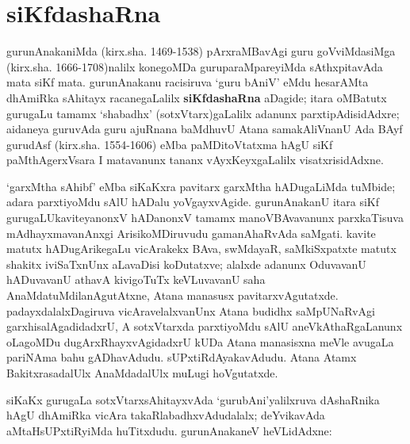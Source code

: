 \makeatletter
\def\@makechapterhead#1{%
  \vspace*{10\p@}%
{\fontsize{13pt}{13pt}\selectfont\raggedright{\bf  BeY joVdf siMgf}\par}
\vspace*{25\p@}%
  {\parindent \z@ \centering \normalfont
    \ifnum \c@secnumdepth >\m@ne
      \if@mainmatter
        {\huge\bfseries  #1}\par\nobreak
	\vskip 4pt
      \fi
    \fi
\smallskip 

 \vskip 10\p@  
{\fontsize{12pt}{12pt}\selectfont\raggedleft{anu: \bf pu.ti.na.}\par}
  }
\vskip 40\p@}
\makeatother


\chapter{siKfdashaRna}\label{chap007}

gurunAnakaniMda (kirx.sha. {\rm 1469-1538}) pArxraMBavAgi guru goVviMdasiMga (kirx.sha. {\rm 1666-1708})nalilx konegoMDa guruparaMpareyiMda sAthxpitavAda mata siKf mata. gurunAnakanu racisiruva `guru bAniV' eMdu hesarAMta dhAmiRka sAhitayx racanegaLalilx {\bf siKfdashaRna} aDagide; itara oMBatutx gurugaLu tamamx `shabadhx' (sotxVtarx)gaLalilx adanunx parxtipAdisidAdxre; aidaneya guruvAda guru ajuRnana baMdhuvU Atana samakAliVnanU Ada BAyf gurudAsf (kirx.sha. {\rm 1554-1606}) eMba paMDitoVtatxma hAgU siKf paMthAgerxVsara I matavanunx tananx vAyxKeyxgaLalilx visatxrisidAdxne.

`garxMtha sAhibf' eMba siKaKxra pavitarx garxMtha hADugaLiMda tuMbide; adara parxti\-yoMdu sAlU hADalu yoVgayxvAgide. gurunAnakanU itara siKf gurugaLU\break kaviteyanonxV hADanonxV tamamx manoVBAvavanunx parxkaTisuva mAdhayxmavanAnxgi Arisi\-koMDiruvudu gamanAhaRvAda saMgati. kavite matutx hADugArikegaLu vicArakekx BAva, swMdayaR, saMkiSxpatxte matutx shakitx iviSaTxnUnx aLavaDisi koDutatxve; alalxde adanunx OduvavanU hADuvavanU athavA kivigoTuTx keVLuvavanU saha AnaMdatuMdila\-nAgutAtxne, Atana manasusx pavitarxvAgutatxde. padayxdalalxDagiruva vicAravelalxvanUnx Atana budidhx saMpUNaRvAgi garxhisalAgadidadxrU, A sotxVtarxda parxtiyoMdu sAlU aneVkAthaRgaLanunx oLagoMDu dugArxRhayxvAgidadxrU kUDa Atana manasisxna meVle avugaLa pari\-NAma bahu gADhavAdudu. sUPxtiRdAyakavAdudu. Atana Atamx BakitxrasadalUlx AnaMda\-dalUlx muLugi hoVgutatxde.

siKaKx gurugaLa sotxVtarxsAhitayxvAda `gurubAni'yalilxruva dAshaRnika hAgU dhAmiRka vicAra takaRlabadhxvAdudalalx; deYvikavAda aMtaHsUPxtiRyiMda huTitxdudu. gurunAnakaneV heVLidAdxne:

